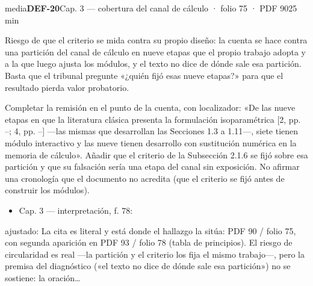 \begin{ficha}{media}{\casilla\textbf{DEF-20}\quad{}\quad Cap. 3 — cobertura del canal de cálculo · folio 75 · PDF 90\hfill 25 min}
\par
{}Riesgo de que el criterio se mida contra su propio diseño: la cuenta se hace contra una partición del canal de cálculo en nueve etapas que el propio trabajo adopta y a la que luego ajusta los módulos, y el texto no dice de dónde sale esa partición. Basta que el tribunal pregunte «¿quién fijó esas nueve etapas?» para que el resultado pierda valor probatorio.\par
{}Completar la remisión en el punto de la cuenta, con localizador: «De las nueve etapas en que la literatura clásica presenta la formulación isoparamétrica [2, pp. --; 4, pp. --]\allowbreak{} —las mismas que desarrollan las Secciones 1.3 a 1.11—, siete tienen módulo interactivo y las nueve tienen desarrollo con sustitución numérica en la memoria de cálculo». Añadir que el criterio de la Subsección 2.1.6 se fijó sobre esa partición y que su falsación sería una etapa del canal sin exposición. No afirmar una cronología que el documento no acredita (que el criterio se fijó antes de construir los módulos).\par
{}\begin{itemize}[leftmargin=1.2em,itemsep=1pt,topsep=1pt]
\item {\small Cap. 3 — interpretación, f. 78: }
\end{itemize}
{\footnotesize\color{gris}ajustado: La cita es literal y está donde el hallazgo la sitúa: PDF 90 /\allowbreak{} folio 75, con segunda aparición en PDF 93 /\allowbreak{} folio 78 (tabla de principios). El riesgo de circularidad es real —la partición y el criterio los fija el mismo trabajo—, pero la premisa del diagnóstico («el texto no dice de dónde sale esa partición») no se sostiene: la oración…\par}
\end{ficha}
